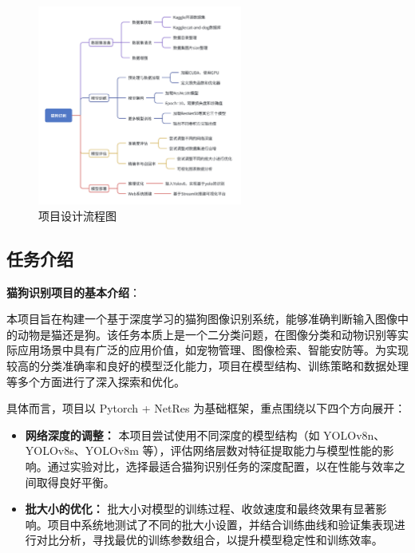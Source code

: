 \documentclass[10.5pt,compsoc]{CjC}
\theoremstyle{mystyle}
\begin{document}
\begin{CJK*}{GBK}{song}
\begin{figure}[H] %
\includegraphics[width=0.6\textwidth]{1746796567985.jpg} %
\caption{项目设计流程图} %
\label{图.main2} %
\end{figure}

\begin{CJK*}{GBK}{hei}
\vskip 1mm
\section{任务介绍}
\textbf{猫狗识别项目的基本介绍}：
\end{CJK*}

本项目旨在构建一个基于深度学习的猫狗图像识别系统，能够准确判断输入图像中的动物是猫还是狗。该任务本质上是一个二分类问题，在图像分类和动物识别等实际应用场景中具有广泛的应用价值，如宠物管理、图像检索、智能安防等。为实现较高的分类准确率和良好的模型泛化能力，项目在模型结构、训练策略和数据处理等多个方面进行了深入探索和优化。

具体而言，项目以 Pytorch + NetRes 为基础框架，重点围绕以下四个方向展开：

\begin{itemize}
  \item \textbf{网络深度的调整：} 本项目尝试使用不同深度的模型结构（如 YOLOv8n、YOLOv8s、YOLOv8m 等），评估网络层数对特征提取能力与模型性能的影响。通过实验对比，选择最适合猫狗识别任务的深度配置，以在性能与效率之间取得良好平衡。
  
  \item \textbf{批大小的优化：} 批大小对模型的训练过程、收敛速度和最终效果有显著影响。项目中系统地测试了不同的批大小设置，并结合训练曲线和验证集表现进行对比分析，寻找最优的训练参数组合，以提升模型稳定性和训练效率。
  

\end{itemize}
\end{CJK*}
\end{document}
